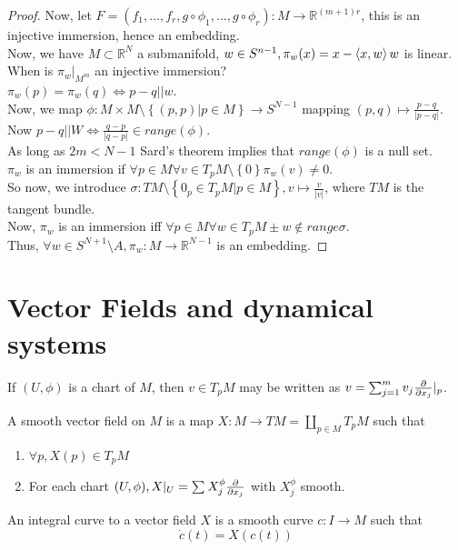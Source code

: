 \documentclass[../main.tex]{subfiles}
\begin{document}
\begin{enumerate}
\begin{proof}
Now, let $ F= ( f_1,\ldots,f_r, g\circ\phi_1, \ldots, g\circ\phi_r) : M\to \mathbb{R}^{ ( m+1) r}$, this is an injective immersion, hence an embedding.\\
Now, we have $M \subset \mathbb{R}^{N}$ a submanifold, $w\in S^{n-1}, \pi_w( x) = x - \left\langle x,w\right\rangle w$ is linear.\\
When is $\pi_w|_{M^{m}} $ an injective immersion?\\
$\pi_w( p) = \pi_w( q) \iff p-q || w$.\\
Now, we map $\phi: M\times M \setminus \left\{ ( p,p) |p \in M  \right\} \to S^{N-1}$ mapping $( p,q)\mapsto \frac{p-q}{|p-q|} $.\\
Now $p-q || W \iff \frac{q-p}{|q-p|}\in range( \phi) $.\\
As long as $2m < N-1$ Sard's theorem implies that $range( \phi) $ is a null set.\\
$\pi_w$ is an immersion if $\forall p \in M \forall v \in T_p M \setminus \left\{ 0 \right\} \pi_w( v) \neq 0$.\\
So now, we introduce $\sigma: TM \setminus \left\{ 0_p \in T_p M | p \in M \right\}, v \mapsto \frac{v}{|v|} $, where $TM$ is the tangent bundle.\\
Now, $\pi_w$ is an immersion iff $\forall p \in M \forall w \in T_p M \pm w \notin range \sigma $.\\
Thus, $\forall w \in S^{N+1}\setminus A, \pi_w:M\to \mathbb{R}^{N-1}$ is an embedding.

	\end{proof}
	
\end{enumerate}
\section{Vector Fields and dynamical systems}
If $( U,\phi) $ is a chart of $M$, then $v\in T_pM$ may be written as $v= \sum_{j=1}^{ m}v_j \frac{\partial}{\partial x_j}|_p$.
\begin{defn}
	A smooth vector field on $M$ is a map $X: M\to TM = \coprod_{p \in M} T_p M$ such that
	\begin{enumerate}
	\item $\forall p, X( p) \in T_p M$ 
	\item For each chart $( U,\phi) , X|_U = \sum_{}^{ } X_j^{\phi} \frac{\partial}{\partial x_j}$ with $X_j^{\phi}$ smooth.
	\end{enumerate}
\end{defn}
\begin{defn}
	An integral curve to a vector field $X$ is a smooth curve $c: I \to M$ such that
	\[ 
		\dot{c} ( t) = X( c( t) ) 
	\]
	
\end{defn}
\end{document}
